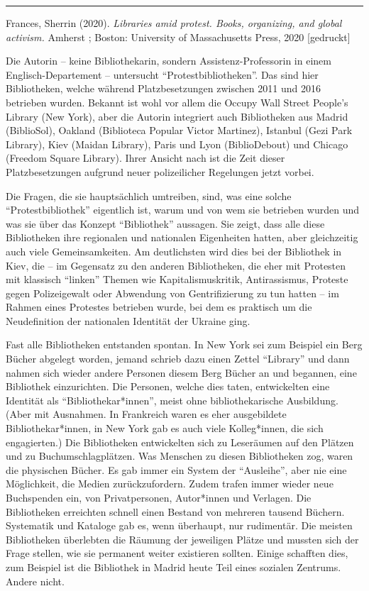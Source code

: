 \documentclass[a4paper,
fontsize=11pt,
oneside,
numbers=noperiodatend,
parskip=half-,
bibliography=totoc,
final
]{scrartcl}
\begin{document}
\begin{center}\rule{0.5\linewidth}{0.5pt}\end{center}

Frances, Sherrin (2020). \emph{Libraries amid protest. Books,
organizing, and global activism.} Amherst ; Boston: University of
Massachusetts Press, 2020 {[}gedruckt{]}

Die Autorin -- keine Bibliothekarin, sondern Assistenz-Professorin in
einem Englisch-Departement -- untersucht \enquote{Protestbibliotheken}.
Das sind hier Bibliotheken, welche während Platzbesetzungen zwischen
2011 und 2016 betrieben wurden. Bekannt ist wohl vor allem die Occupy
Wall Street People's Library (New York), aber die Autorin integriert
auch Bibliotheken aus Madrid (BiblioSol), Oakland (Biblioteca Popular
Victor Martinez), Istanbul (Gezi Park Library), Kiev (Maidan Library),
Paris und Lyon (BiblioDebout) und Chicago (Freedom Square Library).
Ihrer Ansicht nach ist die Zeit dieser Platzbesetzungen aufgrund neuer
polizeilicher Regelungen jetzt vorbei.

Die Fragen, die sie hauptsächlich umtreiben, sind, was eine solche
\enquote{Protestbibliothek} eigentlich ist, warum und von wem sie
betrieben wurden und was sie über das Konzept \enquote{Bibliothek}
aussagen. Sie zeigt, dass alle diese Bibliotheken ihre regionalen und
nationalen Eigenheiten hatten, aber gleichzeitig auch viele
Gemeinsamkeiten. Am deutlichsten wird dies bei der Bibliothek in Kiev,
die -- im Gegensatz zu den anderen Bibliotheken, die eher mit Protesten
mit klassisch \enquote{linken} Themen wie Kapitalismuskritik,
Antirassismus, Proteste gegen Polizeigewalt oder Abwendung von
Gentrifizierung zu tun hatten -- im Rahmen eines Protestes betrieben
wurde, bei dem es praktisch um die Neudefinition der nationalen
Identität der Ukraine ging.

Fast alle Bibliotheken entstanden spontan. In New York sei zum Beispiel
ein Berg Bücher abgelegt worden, jemand schrieb dazu einen Zettel
\enquote{Library} und dann nahmen sich wieder andere Personen diesem
Berg Bücher an und begannen, eine Bibliothek einzurichten. Die Personen,
welche dies taten, entwickelten eine Identität als
\enquote{Bibliothekar*innen}, meist ohne bibliothekarische Ausbildung.
(Aber mit Ausnahmen. In Frankreich waren es eher ausgebildete
Bibliothekar*innen, in New York gab es auch viele Kolleg*innen, die sich
engagierten.) Die Bibliotheken entwickelten sich zu Leseräumen auf den
Plätzen und zu Buchumschlagplätzen. Was Menschen zu diesen Bibliotheken
zog, waren die physischen Bücher. Es gab immer ein System der
\enquote{Ausleihe}, aber nie eine Möglichkeit, die Medien
zurückzufordern. Zudem trafen immer wieder neue Buchspenden ein, von
Privatpersonen, Autor*innen und Verlagen. Die Bibliotheken erreichten
schnell einen Bestand von mehreren tausend Büchern. Systematik und
Kataloge gab es, wenn überhaupt, nur rudimentär. Die meisten
Bibliotheken überlebten die Räumung der jeweiligen Plätze und mussten
sich der Frage stellen, wie sie permanent weiter existieren sollten.
Einige schafften dies, zum Beispiel ist die Bibliothek in Madrid heute
Teil eines sozialen Zentrums. Andere nicht.
\end{document}
